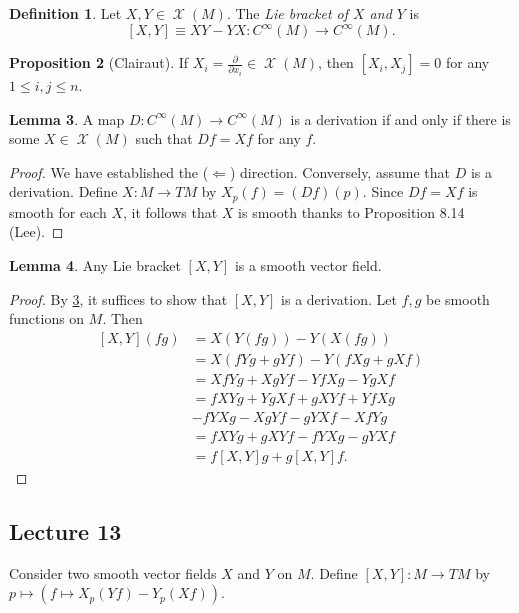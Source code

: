 \documentclass[10pt,letterpaper,cm]{nupset}
\theoremstyle{definition}
\newtheorem{definition}{Definition}[subsection]
\theoremstyle{theorem}
\newtheorem{lemma}[definition]{Lemma}
\newtheorem{prop}[definition]{Proposition}
\theoremstyle{remark}
\newcommand{\1}{\mathbf{1}}
\newcommand{\0}{\vec 0}
\DeclareMathOperator{\vf}{\mathscr{X}}
\begin{document}
\begin{definition}
Let $X, Y \in \vf(M)$. The \textit{Lie bracket of $X$ and $Y$} is $$\left[X, Y\right] \equiv  XY - YX : C^{\infty}(M)\to C^{\infty}(M).$$
\end{definition}

\begin{prop}[Clairaut]
If $X_i = \frac{\partial}{\partial{x_i}}\in \vf(M)$, then $\left[X_i, X_j\right] = 0$ for any $1\leq i,j \leq n$.
\end{prop}

\begin{lemma}\label{deriv}
A map $D: C^{\infty}(M) \to C^{\infty}(M)$ is a derivation if and only if there is some $X \in \vf(M)$ such that $Df = Xf$ for any $f$.
\end{lemma}
\begin{proof}
We have established the ($\Longleftarrow$) direction. Conversely, assume that $D$ is a derivation. Define $X : M \to TM$ by $X_p(f) = (Df)(p)$. Since $Df = Xf$ is smooth for each $X$, it follows that $X$ is smooth thanks to Proposition 8.14 (Lee).
\end{proof}

\begin{lemma}
Any Lie bracket $\left[X, Y\right]$ is a smooth vector field.
\end{lemma}
\begin{proof}
By \cref{deriv}, it suffices to show that $\left[X, Y\right]$ is a derivation. Let $f, g$ be smooth functions on $M$. Then
\begin{align*}
 \left[X, Y\right](fg) & = X(Y(fg)) - Y(X(fg)) 
 \\ & =  X(fYg + gYf) - Y(fXg + gXf) 
 \\ & = XfYg + XgYf - YfXg - YgXf 
 \\ & = fXYg + YgXf + gXYf + YfXg 
 \\ & - fYXg - XgYf - gYXf - XfYg 
 \\ & = fXYg + gXYf - fYXg - gYXf 
 \\ & = f[X,Y]g + g[X,Y]f
.\end{align*}
\end{proof}

\subsection{Lecture 13}


Consider two smooth vector fields $X$ and $Y$ on $M$. Define $\left[X, Y\right] : M \to TM$ by $p\mapsto \left(f \mapsto X_p(Yf) - Y_p(Xf)\right)$.
\end{document}
